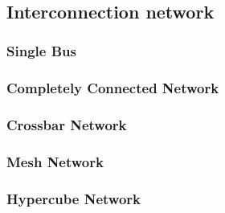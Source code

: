  \\

\subsection{Interconnection network}
\subsubsection{Single Bus}
\subsubsection{Completely Connected Network}
\subsubsection{Crossbar Network}
\subsubsection{Mesh Network}
\subsubsection{Hypercube Network}
